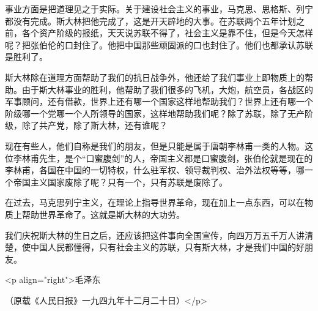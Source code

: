 事业方面是把道理见之于实际。关于建设社会主义的事业，马克思、思格斯、列宁都没有完成。斯大林把他完成了，这是开天辟地的大事。在苏联两个五年计划之前，各个资产阶级的报纸，天天说苏联不得了，社会主义是靠不住，但是今天怎样呢？把张伯伦的口封住了。他把中国那些顽固派的口也封住了。他们也都承认苏联是胜利了。

斯大林除在道理方面帮助了我们的抗日战争外，他还给了我们事业上即物质上的帮助。由于斯大林事业的胜利，他帮助了我们很多的飞机，大炮，航空员，各战区的军事顾问，还有借款，世界上还有哪一个国家这样地帮助我们？世界上还有哪一个阶级哪一个党哪一个人所领导的国家，这样地帮助我们呢？除了苏联，除了无产阶级，除了共产党，除了斯大林，还有谁呢？

现在有些人，他们自称是我们的朋友，但是只能是属于唐朝李林甫一类的人物。这位李林甫先生，是个“口蜜腹剑”的人，帝国主义都是口蜜腹剑，张伯伦就是现在的李林甫，各国在中国的一切特权，什么驻军权、领导裁判权、治外法权等等，哪一个帝国主义国家废除了呢？只有一个，只有苏联是废除了。

在过去，马克思列宁主义，在理论上指导世界革命，现在加上一点东西，可以在物质上帮助世界革命了。这就是斯大林的大功劳。

我们庆祝斯大林的生日之后，还应该把这件事向全国宣传，向四万万五千万人讲清楚，使中国人民都懂得，只有社会主义的苏联，只有斯大林，才是我们中国的好朋友。

<p align="right">毛泽东

（原载《人民日报》一九四九年十二月二十日）</p>


